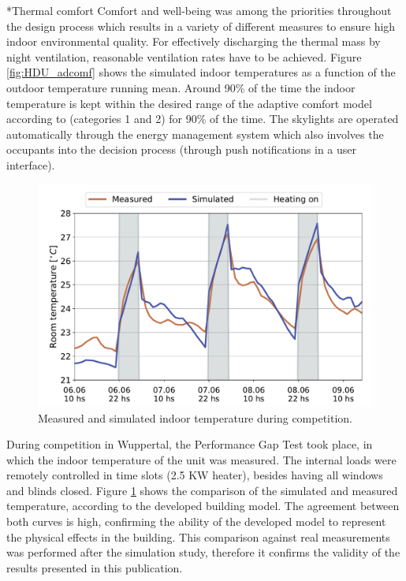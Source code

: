 \documentclass[twocolumn, a4paper,10pt]{article}
\makeatletter
\renewcommand\subsection{\@startsection{subsection}{1}{\z@}{\z@}{\z@}{\normalfont\normalsize\bfseries}}
\renewcommand\subsection{\@startsection{subsection}{1}{\z@}{\z@}{0.1pt}{\normalfont\normalsize\bfseries}}
\makeatother
\begin{document}
\subsection*{Thermal comfort}
Comfort and well-being was among the priorities throughout the design process which results in a variety of different measures to ensure high indoor environmental quality. For effectively discharging the thermal mass by night ventilation, reasonable ventilation rates have to be achieved. Figure \ref{fig:HDU_adcomf} shows the simulated indoor temperatures as a function of the outdoor temperature running mean. Around 90\% of the time the indoor temperature is kept within the desired range of the adaptive comfort model according to \citet{DIN16798} (categories 1 and 2) for 90\% of the time. The skylights are operated automatically through the energy management system which also involves the occupants into the decision process (through push notifications in a user interface).\\ 

\vspace{-5pt} 
\begin{figure}[H]
\centering
\includegraphics[scale=0.34]{img/Mess_PGC.pdf}
\caption{Measured and simulated indoor temperature during competition.}
\label{fig:Mess_PGC}
\end{figure}

During competition in Wuppertal, the Performance Gap Test took place, in which the indoor temperature of the unit was measured. The internal loads were remotely controlled in time slots (2.5 KW heater), besides having all windows and blinds closed. Figure \ref{fig:Mess_PGC} shows the comparison of the simulated and measured temperature, according to the developed building model. The agreement between both curves is high, confirming the ability of the developed model to represent the physical effects in the building. This comparison against real measurements was performed after the simulation study, therefore it confirms the validity of the results presented in this publication.  
\end{document}
